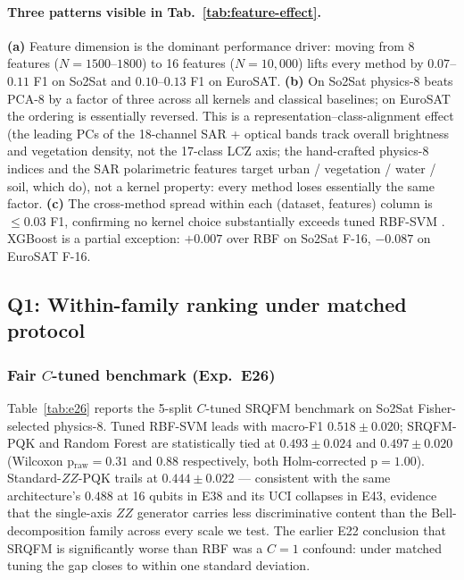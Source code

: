 \documentclass[pdflatex,sn-mathphys]{sn-jnl}
\theoremstyle{plain}
\theoremstyle{remark}
\theoremstyle{definition}
\begin{document}
\paragraph{Three patterns visible in Tab.~\ref{tab:feature-effect}.}
\textbf{(a)} Feature dimension is the dominant performance driver: moving from 8 features ($N\!=\!1500$--$1800$) to 16 features ($N\!=\!10{,}000$) lifts every method by $0.07$--$0.11$ F1 on So2Sat and $0.10$--$0.13$ F1 on EuroSAT.
\textbf{(b)} On So2Sat physics-8 beats PCA-8 by a factor of three across all kernels and classical baselines; on EuroSAT the ordering is essentially reversed.  This is a representation--class-alignment effect (the leading PCs of the 18-channel SAR + optical bands track overall brightness and vegetation density, not the 17-class LCZ axis; the hand-crafted physics-8 indices and the SAR polarimetric features target urban / vegetation / water / soil, which do), not a kernel property: every method loses essentially the same factor.
\textbf{(c)} The cross-method spread within each (dataset, features) column is $\le 0.03$ F1, confirming no kernel choice substantially exceeds tuned RBF-SVM \cite{bowles2024,schnabel2025,canatar2022,florezablan2025}.  XGBoost is a partial exception: $+0.007$ over RBF on So2Sat F-16, $-0.087$ on EuroSAT F-16.

\subsection{Q1: Within-family ranking under matched protocol}

\subsubsection{Fair $C$-tuned benchmark (Exp.\ E26)}\label{sec:e26-results}
Table~\ref{tab:e26} reports the 5-split $C$-tuned SRQFM benchmark on So2Sat Fisher-selected physics-8. Tuned RBF-SVM leads with macro-F1 $0.518\!\pm\!0.020$; SRQFM-PQK and Random Forest are statistically tied at $0.493\!\pm\!0.024$ and $0.497\!\pm\!0.020$ (Wilcoxon p$_\text{raw}=0.31$ and $0.88$ respectively, both Holm-corrected p$=1.00$). Standard-$ZZ$-PQK trails at $0.444\!\pm\!0.022$ --- consistent with the same architecture's $0.488$ at 16 qubits in E38 and its UCI collapses in E43, evidence that the single-axis $ZZ$ generator carries less discriminative content than the Bell-decomposition family across every scale we test. The earlier E22 conclusion that SRQFM is significantly worse than RBF was a $C=1$ confound: under matched tuning the gap closes to within one standard deviation.
\end{document}
